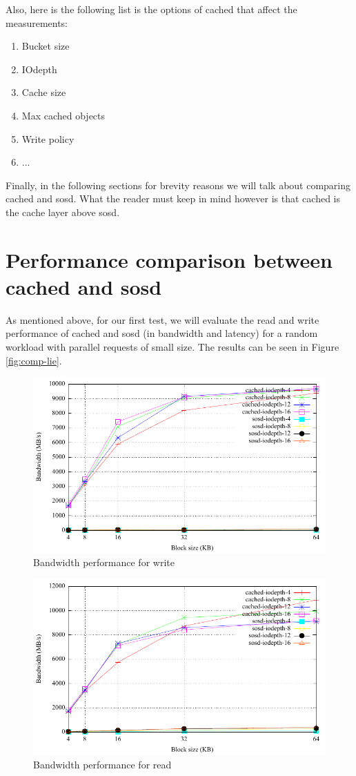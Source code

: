 Also, here is the following list is the options of cached that affect the 
measurements: 

\begin{enumerate}
	\item Bucket size
	\item IOdepth
	\item Cache size
	\item Max cached objects
	\item Write policy
	\item ...
\end{enumerate}

Finally, in the following sections for brevity reasons we will talk about 
comparing cached and sosd. What the reader must keep in mind however is that 
cached is the cache layer above sosd. 

\section{Performance comparison between cached and sosd}

As mentioned above, for our first test, we will evaluate the read and write 
performance of cached and sosd (in bandwidth and latency) for a random workload 
with parallel requests of small size. The results can be seen in Figure 
\ref{fig:comp-lie}. 

\begin{figure}[hb]
	\centering
	\includegraphics[]{diagrams/bw-write-comp-lie.pdf}
	\caption{Bandwidth performance for write}
	\label{fig:bw-write-comp-lie}
\end{figure}

\begin{figure}[hb]
	\centering
	\includegraphics[]{diagrams/bw-read-comp-lie.pdf}
	\caption{Bandwidth performance for read}
	\label{fig:bw-read-comp-lie}
\end{figure}

